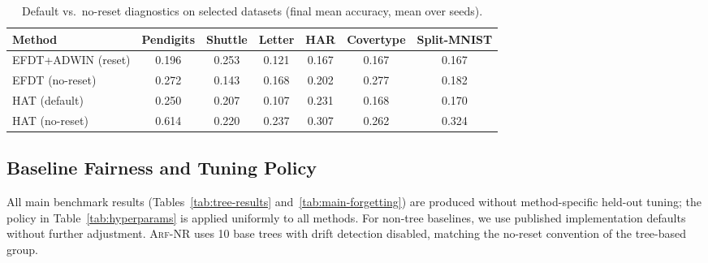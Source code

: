 \documentclass{article}
\newcommand{\arf}{\textsc{Arf}}
\begin{document}
\begin{table}[h]
\caption{Default vs.\ no-reset diagnostics on selected datasets (final mean
accuracy, mean over seeds).}
\label{tab:noreset}
\centering\small
\begin{tabular}{lcccccc}
\toprule
Method & Pendigits & Shuttle & Letter & HAR & Covertype & Split-MNIST \\
\midrule
EFDT+ADWIN (reset)  & 0.196 & 0.253 & 0.121 & 0.167 & 0.167 & 0.167 \\
EFDT (no-reset)     & 0.272 & 0.143 & 0.168 & 0.202 & 0.277 & 0.182 \\
HAT (default)       & 0.250 & 0.207 & 0.107 & 0.231 & 0.168 & 0.170 \\
HAT (no-reset)      & 0.614 & 0.220 & 0.237 & 0.307 & 0.262 & 0.324 \\
\bottomrule
\end{tabular}
\end{table}

\subsection{Baseline Fairness and Tuning Policy}
\label{app:baselines-fairness}

All main benchmark results (Tables~\ref{tab:tree-results}
and~\ref{tab:main-forgetting}) are produced without method-specific held-out
tuning; the policy in Table~\ref{tab:hyperparams} is applied uniformly to all
methods. For non-tree baselines, we use published implementation defaults
without further adjustment. \arf{}-NR uses 10 base trees with drift detection
disabled, matching the no-reset convention of the tree-based group.
\end{document}
